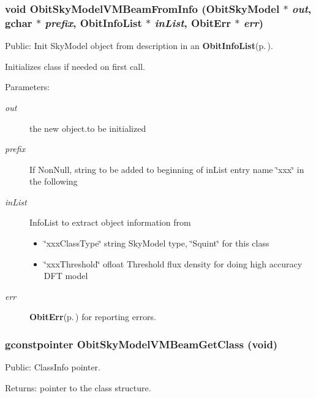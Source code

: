 \subsubsection{\setlength{\rightskip}{0pt plus 5cm}void Obit\-Sky\-Model\-VMBeam\-From\-Info ({\bf Obit\-Sky\-Model} $\ast$ {\em out}, gchar $\ast$ {\em prefix}, {\bf Obit\-Info\-List} $\ast$ {\em in\-List}, {\bf Obit\-Err} $\ast$ {\em err})}\label{ObitSkyModelVMBeam_8h_a5}


Public: Init Sky\-Model object from description in an {\bf Obit\-Info\-List}{\rm (p.\,\pageref{structObitInfoList})}. 

Initializes class if needed on first call. \begin{Desc}
\item[Parameters:]
\begin{description}
\item[{\em out}]the new object.to be initialized \item[{\em prefix}]If Non\-Null, string to be added to beginning of in\-List entry name \char`\"{}xxx\char`\"{} in the following \item[{\em in\-List}]Info\-List to extract object information from \begin{itemize}
\item \char`\"{}xxx\-Class\-Type\char`\"{} string Sky\-Model type, \char`\"{}Squint\char`\"{} for this class \item \char`\"{}xxx\-Threshold\char`\"{} ofloat Threshold flux density for doing high accuracy DFT model \end{itemize}
\item[{\em err}]{\bf Obit\-Err}{\rm (p.\,\pageref{structObitErr})} for reporting errors. \end{description}
\end{Desc}
\subsubsection{\setlength{\rightskip}{0pt plus 5cm}gconstpointer Obit\-Sky\-Model\-VMBeam\-Get\-Class (void)}\label{ObitSkyModelVMBeam_8h_a10}


Public: Class\-Info pointer. 

\begin{Desc}
\item[Returns:]pointer to the class structure. \end{Desc}
